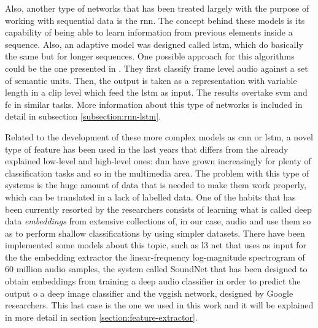 	Also, another type of networks that has been treated largely with the purpose of working with sequential data is the \acrfull{rnn}. The concept behind these models is its capability of being able to learn information from previous elements inside a sequence. Also, an adaptive model was designed called \acrshort{lstm}, which do basically the same but for longer sequences. One possible approach for this algorithms could be the one presented in \cite{Wang2016}. They first classify frame level audio against a set of semantic units. Then, the output is taken as a representation with variable length in a clip level which feed the \acrshort{lstm} as input. The results overtake \acrshort{svm} and \acrshort{fc} in similar tasks. More information about this type of networks is included in detail in subsection \ref{subsection:rnn-lstm}.
	
	Related to the development of these more complex models as \acrshort{cnn} or \acrshort{lstm}, a novel type of feature has been used in the last years that differs from the already explained low-level and high-level ones: \acrfull{dnn} have grown increasingly for plenty of classification tasks and so in the multimedia area. The problem with this type of systems is the huge amount of data that is needed to make them work properly, which can be translated in a lack of labelled data. One of the habits that has been currently resorted by the researchers consists of learning what is called deep data \textit{embeddings} from extensive collections of, in our case, audio and use them so as to perform shallow classifications by using simpler datasets. There have been implemented some models about this topic, such as \acrfull{l3} \cite{Cramer2019} net that uses as input for the the embedding extractor the linear-frequency log-magnitude spectrogram of 60 million audio samples, the system called SoundNet \cite{Aytar2016} that has been designed to obtain embeddings from training a deep audio classifier in order to predict the output o a deep image classifier and the \acrshort{vgg}ish network, designed by Google researchers. This last case is the one we used in this work and it will be explained in more detail in section \ref{section:feature-extractor}.
	
	
